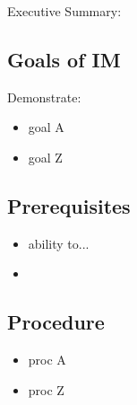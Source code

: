 
Executive Summary:

\subsection{Goals of IM}
Demonstrate:
\begin{itemize}
\item goal A
\item goal Z
\end{itemize}

\subsection{Prerequisites}
\begin{itemize}
\item ability to...
\item {}
\end{itemize}

\subsection{Procedure}
\begin{itemize}
\item proc A
\item proc Z
\end{itemize}